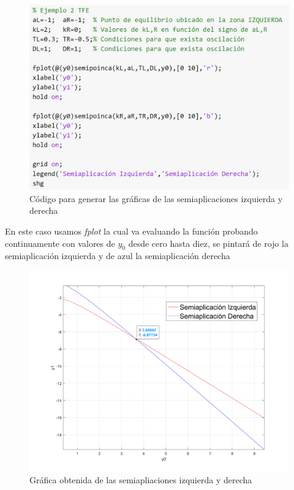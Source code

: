 \documentclass[12pt,a4paper]{report} %
\begin{document}
	\begin{figure}[h]
		\centering
		\includegraphics[width=1\textwidth]{ejem2.jpg}
		\caption{Código para generar las gráficas de las semiaplicaciones izquierda y derecha}
		\label{fig:ejem2}
	\end{figure}\smallskip
	
	En este caso usamos \textit{fplot} la cual va evaluando la función probando continuamente con valores de $y_0$ desde cero hasta diez, se pintará de rojo la semiaplicación izquierda y de azul la semiaplicación derecha 
	\newpage
	
	\begin{figure}[h]
		\centering
		\includegraphics[width=1\textwidth]{ejem2_2.jpg}
		\caption{Gráfica obtenida de las semiapliaciones izquierda y derecha}
		\label{fig:ejem2_2}
	\end{figure}\smallskip
	
\end{document}
